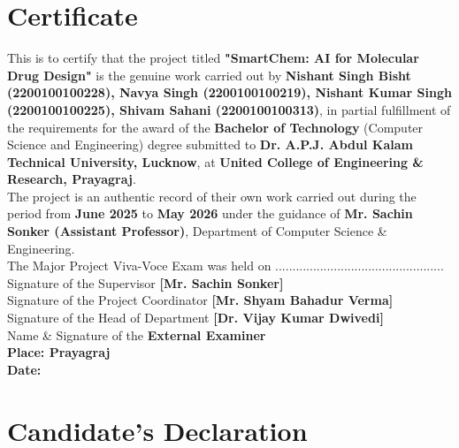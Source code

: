 \documentclass[12pt,a4paper]{report}
\begin{document}
\chapter*{Certificate}
This is to certify that the project titled \textbf{"SmartChem: AI for Molecular Drug Design"} is the genuine work carried out by \textbf{Nishant Singh Bisht (2200100100228), Navya Singh (2200100100219), Nishant Kumar Singh (2200100100225), Shivam Sahani (2200100100313)}, in partial fulfillment of the requirements for the award of the \textbf{Bachelor of Technology} (Computer Science and Engineering) degree submitted to \textbf{Dr. A.P.J. Abdul Kalam Technical University, Lucknow}, at \textbf{United College of Engineering \& Research, Prayagraj}.\\The project is an authentic record of their own work carried out during the period from \textbf{June 2025} to \textbf{May 2026} under the guidance of \textbf{Mr. Sachin Sonker (Assistant Professor)}, Department of Computer Science \& Engineering.\\[0.2cm]The Major Project Viva-Voce Exam was held on .................................................\\[1cm]
Signature of the Supervisor \textbf{[Mr. Sachin Sonker]}\\[0.8cm]
Signature of the Project Coordinator \textbf{[Mr. Shyam Bahadur Verma]}\\[0.8cm]
Signature of the Head of Department \textbf{[Dr. Vijay Kumar Dwivedi]}\\[0.8cm]
Name \& Signature of the \textbf{External Examiner}\\[4cm]\textbf{Place: Prayagraj\\
Date:\\}


\chapter*{Candidate's Declaration}
\end{document}
